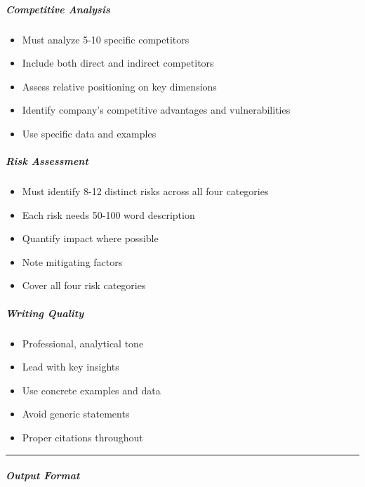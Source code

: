 \documentclass[11pt]{article}
\begin{document}
\subparagraph{Competitive Analysis}\mbox{}\par
\begin{itemize}[leftmargin=*,itemsep=2pt,topsep=2pt]
\item {} Must analyze 5-10 specific competitors
\item {} Include both direct and indirect competitors
\item {} Assess relative positioning on key dimensions
\item {} Identify company's competitive advantages and vulnerabilities
\item {} Use specific data and examples
\end{itemize}

\subparagraph{Risk Assessment}\mbox{}\par
\begin{itemize}[leftmargin=*,itemsep=2pt,topsep=2pt]
\item {} Must identify 8-12 distinct risks across all four categories
\item {} Each risk needs 50-100 word description
\item {} Quantify impact where possible
\item {} Note mitigating factors
\item {} Cover all four risk categories
\end{itemize}

\subparagraph{Writing Quality}\mbox{}\par
\begin{itemize}[leftmargin=*,itemsep=2pt,topsep=2pt]
\item {} Professional, analytical tone
\item {} Lead with key insights
\item {} Use concrete examples and data
\item {} Avoid generic statements
\item {} Proper citations throughout
\end{itemize}

\vspace{0.5em}\hrule\vspace{0.5em}

\subparagraph{Output Format}\mbox{}\par
\end{document}
